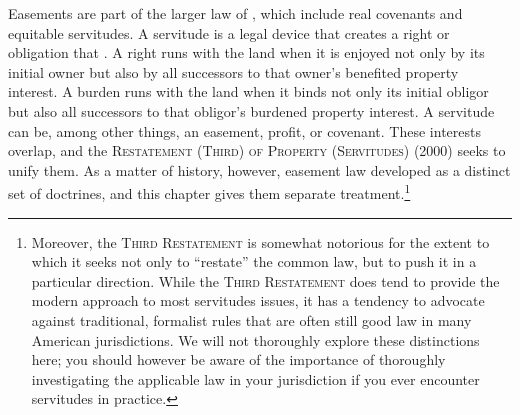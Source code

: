 Easements are part of the larger law of , which
include real
covenants and equitable servitudes.  A servitude is a legal device that creates
a right or obligation that . A right
runs with the
land when it is enjoyed not only by its initial owner but also by all successors
to that owner's benefited property interest. A burden runs with the land when it
binds not only its initial obligor but also all successors to that obligor's
burdened property interest. A servitude can be, among other things, an easement,
profit, or covenant. These interests overlap, and the \textsc{Restatement
(Third) of Property (Servitudes)} (2000) seeks to unify them.
 As a matter of
history, however, easement law
developed as a distinct set of doctrines, and this chapter gives them separate
treatment.\footnote{Moreover, the \textsc{Third Restatement} is somewhat
notorious for
the extent to which it seeks not only to ``restate'' the common law, but to push
it in a particular direction. While the \textsc{Third Restatement} does tend to
provide
the modern approach to most servitudes issues, it has a tendency to advocate
against traditional, formalist rules that are often still good law in many
American jurisdictions. We will not thoroughly explore these distinctions here;
you should however be aware of the importance of thoroughly investigating the
applicable law in your jurisdiction if you ever encounter servitudes in
practice.} 


